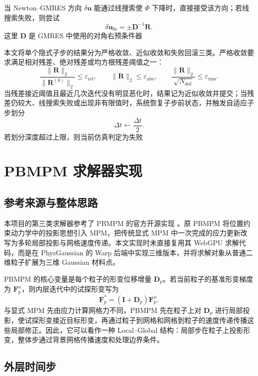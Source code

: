 \documentclass[a4paper]{article}
\begin{document}
当 Newton--GMRES 方向 $\delta\bm{u}$ 能通过线搜索使 $\Phi$ 下降时，直接接受该方向；若线搜索失败，则尝试
\[
    \delta\bm{u}_{\mathrm{fb}}
    =
    \pm
    \bm{D}^{-1}\bm{R}.
\]
这里 $\bm{D}$ 是 GMRES 中使用的对角右预条件器

本文将单个隐式子步的结果分为严格收敛、近似收敛和失败回滚三类。严格收敛要求满足相对残差、绝对残差或均方根残差阈值之一：
\[
    \frac{
        \|\bm{R}\|_2
    }{
        \|\bm{R}^{(0)}\|_2
    }
    \leq
    \varepsilon_{\mathrm{rel}},
    \qquad
    \|\bm{R}\|_2
    \leq
    \varepsilon_{\mathrm{abs}},
    \qquad
    \frac{
        \|\bm{R}\|_2
    }{
        \sqrt{N_{\mathrm{dof}}}
    }
    \leq
    \varepsilon_{\mathrm{rms}}.
\]
当残差接近阈值且最近几次迭代没有明显恶化时，结果记为近似收敛并提交；当残差仍较大、线搜索失败或出现非有限值时，系统恢复子步前状态，并触发自适应子步划分
\[
    \Delta t
    \leftarrow
    \frac{\Delta t}{2}.
\]
若划分深度超过上限，则当前仿真判定为失败
\section{PBMPM 求解器实现}

\subsection{参考来源与整体思路}

本项目的第三类求解器参考了 PBMPM 的官方开源实现 \cite{lewin2024pbmpm}。原 PBMPM 将位置约束动力学中的投影思想引入 MPM，把传统显式 MPM 中一次完成的应力更新改写为多轮局部投影与网格速度传递。本文实现时未直接复用其 WebGPU 求解代码，而是在 PhysGaussian 的 Warp 后端中实现三维版本，并将求解对象从普通二维粒子扩展为三维 Gaussian 材料点。

PBMPM 的核心变量是每个粒子的形变位移增量 $\bm{D}_p$。若当前粒子的基准形变梯度为 $\bm{F}_p^n$，则内层迭代中的试探形变写为
\[
    \bm{F}_p^\ast
    =
    \left(
        \bm{I}
        +
        \bm{D}_p
    \right)
    \bm{F}_p^n.
\]
与显式 MPM 先由应力计算网格力不同，PBMPM 先在粒子上对 $\bm{D}_p$ 进行局部投影，使试探形变接近目标形变，再通过粒子到网格和网格到粒子的速度传递传播这些局部修正。因此，它可以看作一种 Local--Global 结构：局部步在粒子上投影形变，整体步通过背景网格传播速度和处理边界条件。

\subsection{外层时间步}
\end{document}
